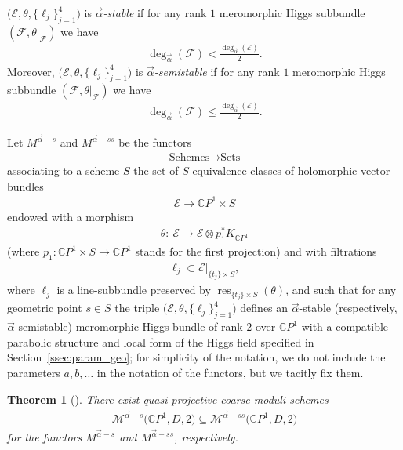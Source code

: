 \documentclass[pdftex]{sigma}
\newcommand{\CP}[1]{\mathbb{C}P^{#1}} %
\newcommand{\E}{{\mathcal E}} %
\newcommand{\F}{{\mathcal F}} %
\newcommand{\Mod}{{\mathcal M}} %
\newcommand{\pardeg}{\deg_{\vec{\alpha}}}
\DeclareMathOperator{\res}{res}
\numberwithin{equation}{section}
\newtheorem{thm}[prop]{Theorem}
\begin{document}
 \begin{defn} $\big(\E ,\theta , \{ \ell_j \}_{j=1}^4\big)$ is {\it $\vec{\alpha}$-stable} if for any rank $1$ meromorphic Higgs subbundle $(\F , \theta|_{\F})$ we have
 \begin{gather*}
 \pardeg (\F ) < \frac{\pardeg (\E )}2.
 \end{gather*}
 Moreover, $\big(\E ,\theta ,\{ \ell_j \}_{j=1}^4\big)$ is {\it $\vec{\alpha}$-semistable} if for any rank $1$ meromorphic Higgs subbundle $(\F , \theta|_{\F})$ we have
 \begin{gather*}
 \pardeg (\F ) \leq \frac{\pardeg (\E )}2.
 \end{gather*}
\end{defn}

Let $M^{\vec{\alpha}-s}$ and $M^{\vec{\alpha}-ss}$ be the functors
\begin{gather*}
 \mbox{Schemes} \to \mbox{Sets}
\end{gather*}
associating to a scheme $S$ the set of $S$-equivalence classes of holomorphic vector-bundles
\begin{gather*}
 \E \to \CP1 \times S
\end{gather*}
endowed with a morphism
\begin{gather*}
 \theta\colon \ \E \to \E \otimes p_1^* K_{\CP1}
\end{gather*}
(where $p_1\colon \CP1 \times S \to \CP1$ stands for the first projection) and with filtrations
\begin{gather*}
 \ell_j \subset \E|_{\{ t_j\} \times S},
\end{gather*}
where $\ell_j$ is a line-subbundle preserved by $\res_{\{ t_j\}
 \times S} (\theta )$, and such that for any geometric point $s \in
 S$ the triple $\big(\E , \theta, \{ \ell_j \}_{j=1}^4\big)$ defines an
 $\vec{\alpha}$-stable (respectively, $\vec{\alpha}$-semistable)
 meromorphic Higgs bundle of rank $2$ over $\CP1$ with a compatible
 parabolic structure {and local form of the Higgs field specified
 in Section~\ref{ssec:param_geo}; for simplicity of the notation,
 we do not include the parameters $a,b,\ldots $ in the notation of the functors,
 but we tacitly fix them.}

\begin{thm}[\cite{nit}] There exist quasi-projective coarse moduli schemes
 \begin{gather*}
 \Mod^{\vec{\alpha}-s} \big(\CP1, D, 2\big) \subseteq \Mod^{\vec{\alpha}-ss} \big(\CP1, D, 2\big)
 \end{gather*} for the functors $M^{\vec{\alpha}-s}$ and $M^{\vec{\alpha}-ss}$, respectively.
\end{thm}
\end{document}
